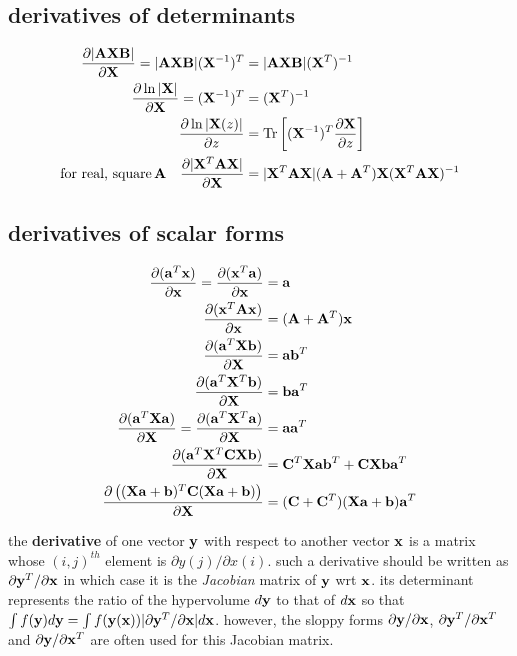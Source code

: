 \documentclass[12pt]{article}
\begin{document}
\subsection{derivatives of determinants}
\begin{align}
\frac{\partial |\AA\XX\BB|}{\partial \XX} = |\AA\XX\BB|(\XX^{-1})^T &=
|\AA\XX\BB|(\XX^T)^{-1}\\
\frac{\partial \ln |\XX|}{\partial \XX} = (\XX^{-1})^T &= (\XX^T)^{-1}\\
\frac{\partial \ln |\XX(z)|}{\partial z} &=
\trace{(\XX^{-1})^T\frac{\partial \XX}{\partial z}} \\
\text{for real, square} \thinspace \AA \quad 
\frac{\partial |\XX^T\AA\XX|}{\partial \XX} &=
|\XX^T\AA\XX|(\AA+\AA^T)\XX(\XX^T\AA\XX)^{-1} 
\end{align}

\subsection{derivatives of scalar forms}
\begin{align}
\frac{\partial (\aaa^T \xx)}{\partial \xx} = 
\frac{\partial (\xx^T \aaa)}{\partial \xx} &= \aaa \\
\frac{\partial (\xx^T\AA\xx)}{\partial \xx} &= (\AA + \AA^T)\xx \\ 
\frac{\partial (\aaa^T\XX\bb)}{\partial \XX} &= \aaa\bb^T  \\
\frac{\partial (\aaa^T\XX^T\bb)}{\partial \XX} &= \bb\aaa^T  \\
\frac{\partial (\aaa^T\XX\aaa)}{\partial \XX} = 
\frac{\partial (\aaa^T\XX^T\aaa)}{\partial \XX} &= \aaa\aaa^T \\
\frac{\partial (\aaa^T\XX^T\CC\XX\bb)}{\partial \XX} &= 
\CC^T\XX\aaa\bb^T + \CC\XX\bb\aaa^T \\
\frac{\partial \left((\XX\aaa+\bb)^T\CC(\XX\aaa+\bb)\right)}{\partial \XX} &= 
(\CC+\CC^T)(\XX\aaa+\bb)\aaa^T
\end{align}


\noindent
the {\bf derivative} of one vector $\yy$ with respect to
another vector $\xx$ is a matrix whose $(i,j)^{th}$ element is
$\partial y(j)/ \partial x(i)$. such a derivative should be written as
$\partial \yy^T / \partial \xx$
 in which case it is the {\em
Jacobian} matrix of $\yy$ wrt $\xx$. its determinant 
represents the ratio of the hypervolume $d\yy$ to that of
$d\xx$ so that 
$\int f(\yy) d\yy = \int f(\yy(\xx)) |\partial \yy^T /\partial \xx|d\xx$. 
however, the sloppy forms 
$\partial \yy / \partial \xx$,
$\partial \yy^T / \partial \xx^T$ and
$\partial \yy / \partial \xx^T$ are often used for this Jacobian matrix.
\end{document}
